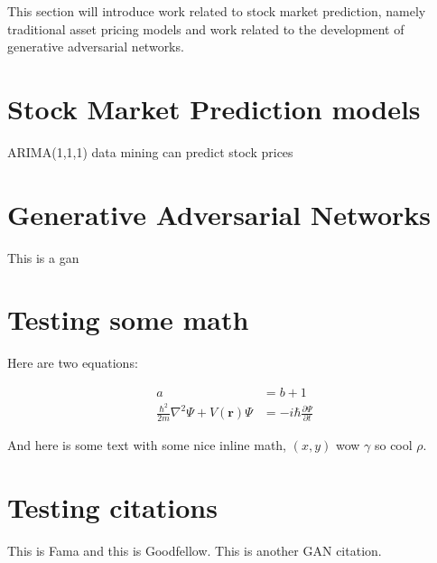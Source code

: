 This section will introduce work related to stock market prediction, namely traditional asset pricing models and work related to the development of generative adversarial networks.
\section{Stock Market Prediction models}
ARIMA(1,1,1)
data mining can predict stock prices \cite{stockprediction_datamining}

\section{Generative Adversarial Networks}
This is a gan\cite{gan_original}


\section{Testing some math}
Here are two equations:

\begin{align}
a &= b + 1 \\
\frac{\hbar^2}{2m}\nabla^2\Psi + V(\mathbf{r})\Psi
&= -i\hbar \frac{\partial\Psi}{\partial t}    
\end{align}


And here is some text with some nice inline math, $(x, y)$ wow $\gamma$ so cool $\rho$.


\section{Testing citations}
This is Fama\cite{fama_efficient_market} and this is Goodfellow\cite{gan_original}.
This is another GAN citation\cite{high-frequencyGAN}.
